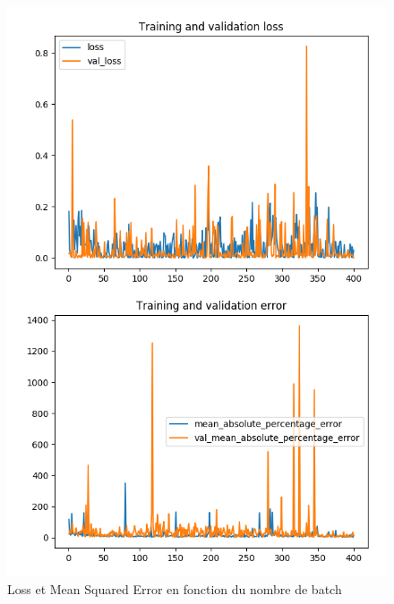\documentclass{article}
\begin{document}
    \begin{figure}[H]
        \centering
        \includegraphics[scale=0.5]{results.png}
        \caption{Loss et Mean Squared Error en fonction du nombre de batch}
        \label{fig:schema}
    \end{figure}
    
\end{document}
